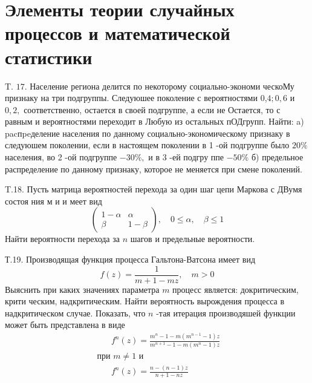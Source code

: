\documentclass[a4paper,12pt]{article} %
\begin{document}
\section{Элементы теории случайных процессов и математической статистики}




\begin{example}


T. $17 .$ Население региона делится по некоторому социально-экономи ческоМу признаку на три подгруппы. Следуюшее поколение с вероятностями 0,$4 ; 0,6$ и $0,2,$ соответственно, остается в своей подгруппе, а если не
Остается, то с равным и вероятностями переходит в Любую из остальных пОДгрупп. Найти:
a) pacпpeделение населения по данному социально-экономическому признаку в следуюшем поколении, если в настоящем поколении в 1 -ой подгруппе было $20 \%$ населения, во 2 -ой подгруппе $-30 \%,$ и в 3 -ей подгру ппе $-50 \%$
б) предельное распределение по данному признаку, которое не меняется при смене поколений.



\end{example}



\begin{example}

T.18. Пусть матрица вероятностей перехода за один шаг цепи Маркова с
ДВумя состоя ния м и и меет вид
$$
\left(\begin{array}{cc}
1-\alpha & \alpha \\
\beta & 1-\beta
\end{array}\right), \quad 0 \leqslant \alpha, \quad \beta \leqslant 1
$$
Найти вероятности перехода за $n$ шагов и предельные вероятности.




\end{example}



\begin{example}

Т.19. Производящая функция процесса Гальтона-Ватсона имеет вид
$$
f(z)=\frac{1}{m+1-m z}, \quad m>0
$$
Выяснить при каких значениях параметра $m$ процесс является: докритическим, крити ческим, надкритическим. 
Найти вероятность вырождения процесса в надкритическом случае. 
Показать, что $n$ -тая итерация производяшей функции может быть представлена в виде
\begin{equation}
\begin{array}{l}
\qquad f^{n}(z)=\frac{m^{n}-1-m\left(m^{n-1}-1\right) z}{m^{n+1}-1-m\left(m^{n}-1\right) z} \\
\text { при } m \neq 1 \text { и } \\
\qquad f^{n}(z)=\frac{n-(n-1) z}{n+1-n z}
\end{array}
\end{equation}


\end{example}
\end{document}
